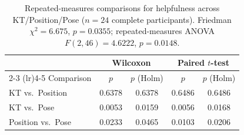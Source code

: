 \begin{table}[htbp]
\centering
\caption{Repeated-measures comparisons for helpfulness across KT/Position/Pose ($n = 24$ complete participants). Friedman $\chi^2 = 6.675$, $p = 0.0355$; repeated-measures ANOVA $F(2,46) = 4.6222$, $p = 0.0148$.}
\label{tab:comparisons-helpfulness}
\begin{tabular}{lcccc}
\toprule
& \multicolumn{2}{c}{Wilcoxon} & \multicolumn{2}{c}{Paired $t$-test} \\
\cmidrule(lr){2-3} \cmidrule(lr){4-5}
Comparison & $p$ & $p$ (Holm) & $p$ & $p$ (Holm) \\
\midrule
KT vs.\ Position   & 0.6378 & 0.6378 & 0.6486 & 0.6486 \\
KT vs.\ Pose       & 0.0053 & 0.0159 & 0.0056 & 0.0168 \\
Position vs.\ Pose & 0.0233 & 0.0465 & 0.0103 & 0.0206 \\
\bottomrule
\end{tabular}
\end{table}

